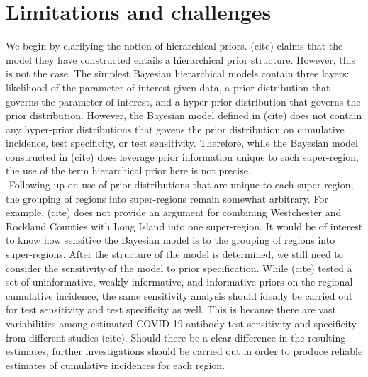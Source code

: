 \section{Limitations and challenges}
We begin by clarifying the notion of hierarchical priors. (cite) claims that the model they have constructed entails a hierarchical prior structure. However, this is not the case. The simplest Bayesian hierarchical models contain three layers: likelihood of the parameter of interest given data, a prior distribution that governs the parameter of interest, and a hyper-prior distribution that governs the prior distribution. However, the Bayesian model defined in (cite) does not contain any hyper-prior distributions that govens the prior distribution on cumulative incidence, test specificity, or test sensitivity. Therefore, while the Bayesian model constructed in (cite) does leverage prior information unique to each super-region, the use of the term hierarchical prior here is not precise.\\
\newline$ $
Following up on use of prior distributions that are unique to each super-region, the grouping of regions into super-regions remain somewhat arbitrary. For example, (cite) does not provide an argument for combining Westchester and Rockland Counties with Long Island into one super-region. It would be of interest to know how sensitive the Bayesian model is to the grouping of regions into super-regions. After the structure of the model is determined, we still need to consider the sensitivity of the model to prior specification. While (cite) tested a set of uninformative, weakly informative, and informative priors on the regional cumulative incidence, the same sensitivity analysis should ideally be carried out for test sensitivity and test specificity as well. This is because there are vast variabilities among estimated COVID-19 antibody test sensitivity and specificity from different studies (cite). Should there be a clear difference in the resulting estimates, further investigations should be carried out in order to produce reliable estimates of cumulative incidences for each region.\\
\newline$ $
